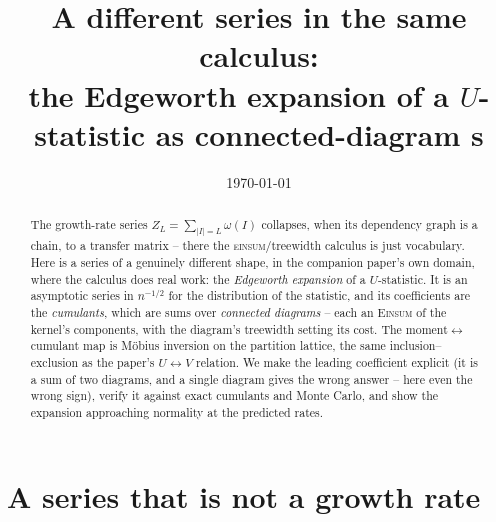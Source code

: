 \documentclass[11pt]{article}
\title{\bf A different series in the same calculus:\\[2pt]
       \large the Edgeworth expansion of a $U$-statistic as connected-diagram
       \Einsum{}s}
\date{\today}
\newcommand{\Einsum}{\textsc{Einsum}}
\theoremstyle{plain}
\theoremstyle{definition}
\begin{document}
\maketitle
\vspace{-1.4em}

\begin{abstract}\noindent
The growth-rate series $Z_L=\sum_{|I|=L}\omega(I)$ collapses, when its
dependency graph is a chain, to a transfer matrix -- there the
\textsc{einsum}/treewidth calculus is just vocabulary. Here is a series of a
genuinely different shape, in the companion paper's own domain, where the
calculus does real work: the \emph{Edgeworth expansion} of a $U$-statistic. It is
an asymptotic series in $n^{-1/2}$ for the distribution of the statistic, and its
coefficients are the \emph{cumulants}, which are sums over \emph{connected
diagrams} -- each an \Einsum{} of the kernel's components, with the diagram's
treewidth setting its cost. The moment$\leftrightarrow$cumulant map is M\"obius
inversion on the partition lattice, the same inclusion--exclusion as the paper's
$U\!\leftrightarrow\!V$ relation. We make the leading coefficient explicit (it is
a sum of two diagrams, and a single diagram gives the wrong answer -- here even
the wrong sign), verify it against exact cumulants and Monte Carlo, and show the
expansion approaching normality at the predicted rates.
\end{abstract}

\section{A series that is not a growth rate}
\end{document}
